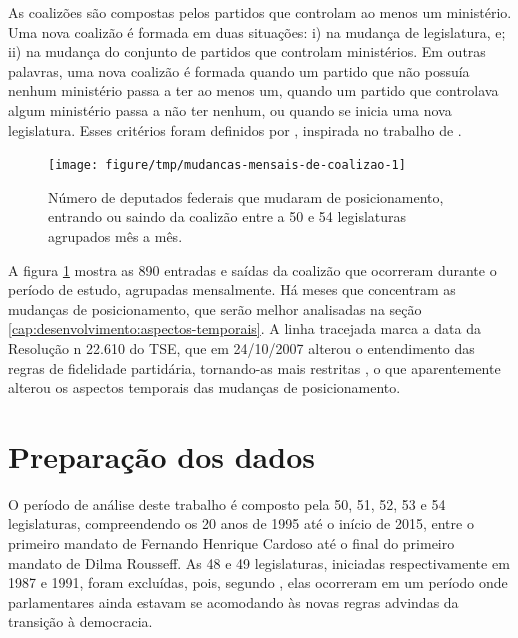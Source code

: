 \documentclass[a4paper,titlepage]{ppgi}\usepackage[]{graphicx}\usepackage[]{color}
\newenvironment{knitrout}{}{} %
\begin{document}
As coalizões são compostas pelos partidos que controlam ao menos um ministério.
Uma nova coalizão é formada em duas situações: i) na mudança de legislatura, e;
ii) na mudança do conjunto de partidos que controlam ministérios. Em outras
palavras, uma nova coalizão é formada quando um partido que não possuía nenhum
ministério passa a ter ao menos um, quando um partido que controlava algum
ministério passa a não ter nenhum, ou quando se inicia uma nova legislatura.
Esses critérios foram definidos por , inspirada no
trabalho de .

\begin{knitrout}
\color{fgcolor}\begin{figure}
\texttt{[image: figure/tmp/mudancas-mensais-de-coalizao-1]} \caption[Número de deputados federais que mudaram de posicionamento, entrando ou saindo da coalizão entre a 50\textordfeminine{} e 54\textordfeminine{} legislaturas agrupados mês a mês]{Número de deputados federais que mudaram de posicionamento, entrando ou saindo da coalizão entre a 50\textordfeminine{} e 54\textordfeminine{} legislaturas agrupados mês a mês.}\label{fig:mudancas-mensais-de-coalizao}
\end{figure}


\end{knitrout}

A figura \ref{fig:mudancas-mensais-de-coalizao} mostra as
890 entradas e saídas da coalizão que ocorreram
durante o período de estudo, agrupadas mensalmente. Há meses que concentram
as mudanças de posicionamento, que serão melhor analisadas na seção
\ref{cap:desenvolvimento:aspectos-temporais}. A linha tracejada marca a data da Resolução
n\textordmasculine{} 22.610 do TSE, que em 24/10/2007
alterou o entendimento das regras de fidelidade partidária, tornando-as mais
restritas \cite{TSE2007}, o que aparentemente alterou os aspectos temporais das
mudanças de posicionamento.

\section{Preparação dos dados}


O período de análise deste trabalho é composto pela 50\textordfeminine{},
51\textordfeminine{}, 52\textordfeminine{}, 53\textordfeminine{} e
54\textordfeminine{} legislaturas, compreendendo os 20 anos de 1995 até o
início de 2015, entre o primeiro mandato de Fernando Henrique Cardoso até o
final do primeiro mandato de Dilma Rousseff. As 48\textordfeminine{} e
49\textordfeminine{} legislaturas, iniciadas respectivamente em 1987 e 1991,
foram excluídas, pois, segundo , elas ocorreram em um
período onde parlamentares ainda estavam se acomodando às novas regras advindas
da transição à democracia.
\end{document}

